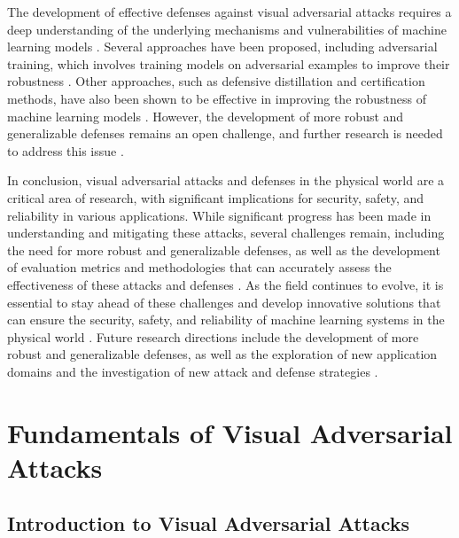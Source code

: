 \documentclass[11pt,a4paper]{article}
\begin{document}
The development of effective defenses against visual adversarial attacks requires a deep understanding of the underlying mechanisms and vulnerabilities of machine learning models \cite{doi:10.24963/ijcai.2021/694,doi:10.1007/s11633-019-1211-x}. Several approaches have been proposed, including adversarial training, which involves training models on adversarial examples to improve their robustness \cite{doi:10.1109/iccv48922.2021.01542,arxiv:2003.06693}. Other approaches, such as defensive distillation and certification methods, have also been shown to be effective in improving the robustness of machine learning models \cite{arxiv:2002.07405,arxiv:2003.06693}. However, the development of more robust and generalizable defenses remains an open challenge, and further research is needed to address this issue \cite{arxiv:1902.06705,doi:10.1109/access.2022.3216291}.

In conclusion, visual adversarial attacks and defenses in the physical world are a critical area of research, with significant implications for security, safety, and reliability in various applications. While significant progress has been made in understanding and mitigating these attacks, several challenges remain, including the need for more robust and generalizable defenses, as well as the development of evaluation metrics and methodologies that can accurately assess the effectiveness of these attacks and defenses \cite{doi:10.24963/ijcai.2021/694,doi:10.1007/s11633-019-1211-x}. As the field continues to evolve, it is essential to stay ahead of these challenges and develop innovative solutions that can ensure the security, safety, and reliability of machine learning systems in the physical world \cite{doi:10.1016/j.eng.2019.12.012,arxiv:1810.00069}. Future research directions include the development of more robust and generalizable defenses, as well as the exploration of new application domains and the investigation of new attack and defense strategies \cite{doi:10.1016/j.eng.2019.12.012,arxiv:1810.00069}.


\section{Fundamentals of Visual Adversarial Attacks}



\subsection{Introduction to Visual Adversarial Attacks}
\end{document}
